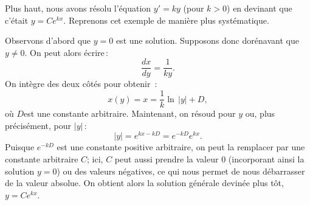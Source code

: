 \begin{example}
Plus haut, nous avons résolu l'équation $y' = ky$ (pour $k > 0$) en devinant que c'était 
$y=Ce^{kx}$.  Reprenons cet exemple de manière plus systématique.

Observons d'abord que  $y=0$ est une solution.  Supposons donc dorénavant que $y\not= 0$.  On peut alors écrire\,: 
\begin{equation*}
	\frac{dx}{dy} = \frac{1}{ky} .
\end{equation*}
On intègre des deux côtés pour obtenir \,: 
\begin{equation*}
	x(y) = x = \frac{1}{k} \ln \, \lvert y \rvert + D,
\end{equation*}
où $D$est une constante arbitraire.
Maintenant, on résoud pour $y$ ou, plus précisément, pour $\lvert y \rvert$\,: 
\begin{equation*}
	\lvert y \rvert =	e^{kx-kD} = e^{-kD} e^{k x} .
\end{equation*}
Puisque $e^{-kD}$ est une constante positive arbitraire, on peut la remplacer par une constante arbitraire $C$; ici, $C$ peut aussi prendre la valeur 0 (incorporant ainsi la solution $y=0$) ou des valeurs négatives, ce qui nous permet de nous débarrasser de la valeur absolue.  On obtient alors la solution générale devinée plus tôt, $y = Ce^{kx}$.
\end{example}

